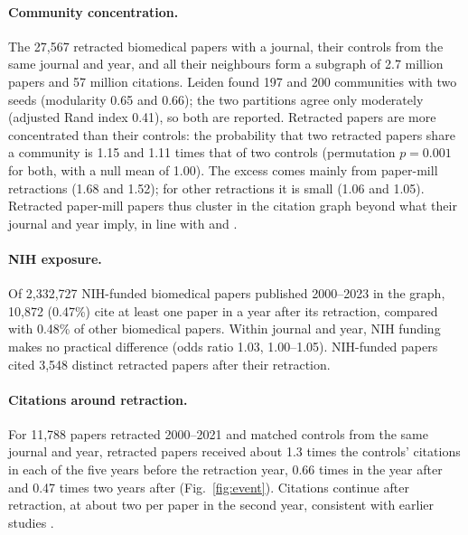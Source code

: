 \paragraph{Community concentration.} The 27,567 retracted biomedical papers with a journal, their controls from the
same journal and year, and all their neighbours form a subgraph of 2.7 million papers and 57 million citations. Leiden
found 197 and 200 communities with two seeds (modularity 0.65 and 0.66); the two partitions agree only moderately
(adjusted Rand index 0.41), so both are reported. Retracted papers are more concentrated than their controls: the probability that
two retracted papers share a community is 1.15 and 1.11 times that of two controls (permutation $p = 0.001$ for
both, with a null mean of 1.00). The excess comes mainly from paper-mill retractions (1.68 and 1.52); for other
retractions it is small (1.06 and 1.05). Retracted paper-mill papers thus cluster in the citation graph beyond what
their journal and year imply, in line with \citet{feng2024molbio} and \citet{candal2024references}.

\paragraph{NIH exposure.} Of 2,332,727 NIH-funded biomedical papers published 2000--2023 in the graph, 10,872 (0.47\%)
cite at least one paper in a year after its retraction, compared with 0.48\% of other biomedical papers. Within journal
and year, NIH funding makes no practical difference (odds ratio 1.03, 1.00--1.05). NIH-funded papers cited 3,548
distinct retracted papers after their retraction.

\paragraph{Citations around retraction.} For 11,788 papers retracted 2000--2021 and matched controls from the same
journal and year, retracted papers received about 1.3 times the controls' citations in each of the five years before
the retraction year, 0.66 times in the year after and 0.47 times two years after (Fig.~\ref{fig:event}). Citations continue after
retraction, at about two per paper in the second year, consistent with earlier studies
\citep{hsiao2021continued,schneider2020continued}.
